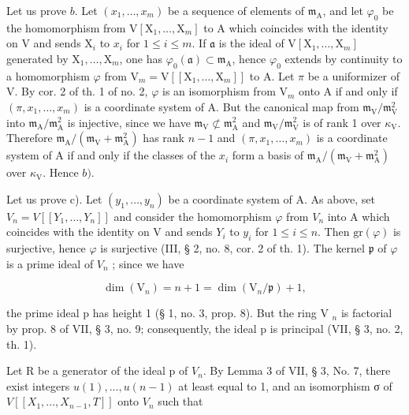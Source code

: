 Let us prove \(b\). Let \((x_{1},\ldots,x_{m})\) be a sequence of elements of \(\mathfrak{m}_{\mathrm{A}}\), and let \(\varphi_{0}\) be the homomorphism from \(\mathrm{V}[\mathrm{X}_{1},\ldots,\mathrm{X}_{m}]\) to A which coincides with the identity on V and sends \(\mathrm{X}_{i}\) to \(x_{i}\) for \(1\leqslant i\leqslant m\). If \(\mathfrak{a}\) is the ideal of \(\mathrm{V}[\mathrm{X}_{1},\ldots,\mathrm{X}_{m}]\) generated by \(\mathrm{X}_{1},\ldots,\mathrm{X}_{m}\), one has \(\varphi_{0}(\mathfrak{a})\subset\mathfrak{m}_{\mathrm{A}}\), hence \(\varphi_{0}\) extends by continuity to a homomorphism \(\varphi\) from \(\mathrm{V}_{m}=\mathrm{V}[[\mathrm{X}_{1},\ldots,\mathrm{X}_{m}]]\) to A. Let \(\pi\) be a uniformizer of V. By cor. 2 of th. 1 of no. 2, \(\varphi\) is an isomorphism from \(\mathrm{V}_{m}\) onto A if and only if \((\pi,x_{1},\ldots,x_{m})\) is a coordinate system of A. But the canonical map from \(\mathfrak{m}_{\mathrm{V}}/\mathfrak{m}_{\mathrm{V}}^{2}\) into \(\mathfrak{m}_{\mathrm{A}}/\mathfrak{m}_{\mathrm{A}}^{2}\) is injective, since we have \(\mathfrak{m}_{\mathrm{V}}\not\subset\mathfrak{m}_{\mathrm{A}}^{2}\) and \(\mathfrak{m}_{\mathrm{V}}/\mathfrak{m}_{\mathrm{V}}^{2}\) is of rank 1 over \(\kappa_{\mathrm{V}}\). Therefore \(\mathfrak{m}_{\mathrm{A}}/(\mathfrak{m}_{\mathrm{V}}+\mathfrak{m}_{\mathrm{A}}^{2})\) has rank \(n-1\) and \((\pi,x_{1},\ldots,x_{m})\) is a coordinate system of A if and only if the classes of the \(x_{i}\) form a basis of \(\mathfrak{m}_{\mathrm{A}}/(\mathfrak{m}_{\mathrm{V}}+\mathfrak{m}_{\mathrm{A}}^{2})\) over \(\kappa_{\mathrm{V}}\). Hence \(b)\).

Let us prove c). Let \((y_{1}, \ldots, y_{n})\) be a coordinate system of A. As above, set \(V_{n} = V[[Y_{1}, \ldots, Y_{n}]]\) and consider the homomorphism \(\varphi\) from \(V_{n}\) into A which coincides with the identity on V and sends \(Y_{i}\) to \(y_{i}\) for \(1 \leqslant i \leqslant n\). Then \(\text{gr}(\varphi)\) is surjective, hence \(\varphi\) is surjective (III, § 2, no. 8, cor. 2 of th. 1). The kernel \(\mathfrak{p}\) of \(\varphi\) is a prime ideal of \(V_{n}\) ; since we have

\[
\dim (\mathrm{V} _ {n}) = n + 1 = \dim (\mathrm{V} _ {n} / \mathfrak {p}) + 1,
\]

the prime ideal p has height 1 (§ 1, no. 3, prop. 8). But the ring V \(_{n}\) is factorial by prop. 8 of VII, § 3, no. 9; consequently, the ideal p is principal (VII, § 3, no. 2, th. 1).

Let R be a generator of the ideal p of \(V_{n}\). By Lemma 3 of VII, § 3, No. 7, there exist integers \(u(1), ..., u(n - 1)\) at least equal to 1, and an isomorphism σ of \(V[[X_{1}, ..., X_{n-1}, T]]\) onto \(V_{n}\) such that

